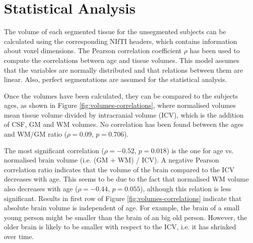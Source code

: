 \section{Statistical Analysis}



The volume of each segmented tissue for the unsegmented subjects can be calculated using the corresponding NIfTI headers, which contains information about voxel dimensions. The Pearson correlation coefficient $\rho$ has been used to compute the correlations between age and tissue volumes. This model assumes that the variables are normally distributed and that relations between them are linear. Also, perfect segmentations are assumed for the statistical analysis.

Once the volumes have been calculated, they can be compared to the subjects ages, as shown in Figure \ref{fig:volumes-correlations}, where normalised volumes mean tissue volume divided by intracranial volume (ICV), which is the addition of CSF, GM and WM volumes. No correlation has been found between the ages and WM/GM ratio ($\rho = 0.09$, $p = 0.706$).

The most significant correlation ($\rho = -0.52$, $p = 0.018$) is the one for age vs. normalised brain volume (i.e. (GM + WM) / ICV). A negative Pearson correlation ratio indicates that the volume of the brain compared to the ICV decreases with age. This seems to be due to the fact that normalised WM volume also decreases with age ($\rho = -0.44$, $p = 0.055$), although this relation is less significant. Results in first row of Figure \ref{fig:volumes-correlations} indicate that absolute brain volume is independent of age. For example, the brain of a small young person might be smaller than the brain of an big old person. However, the older brain is likely to be smaller with respect to the ICV, i.e. it has shrinked over time.


